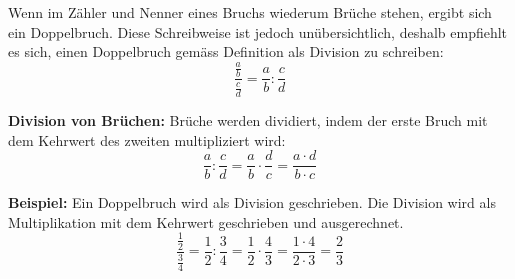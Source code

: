 Wenn im Zähler und Nenner eines Bruchs wiederum Brüche stehen, ergibt sich ein Doppelbruch. Diese Schreibweise ist jedoch unübersichtlich, deshalb empfiehlt es sich, einen Doppelbruch gemäss Definition als Division zu schreiben:
\[
  \frac{\frac{a}{b}}{\frac{c}{d}} = \frac{a}{b}:\frac{c}{d}
\]
\begin{theorem}
  \textbf{Division von Brüchen:} Brüche werden dividiert, indem der erste Bruch mit dem Kehrwert des zweiten multipliziert wird:
  \[
    \frac{a}{b}:\frac{c}{d} = \frac{a}{b}\cdot\frac{d}{c} = \frac{a\cdot d}{b\cdot c}
  \]
\end{theorem}
\begin{example}
  \textbf{Beispiel:} Ein Doppelbruch wird als Division geschrieben. Die Division wird als Multiplikation mit dem Kehrwert geschrieben und ausgerechnet.
  \[
    \frac{\frac{1}{2}}{\frac{3}{4}} = \frac{1}{2}:\frac{3}{4} = \frac{1}{2}\cdot\frac{4}{3} = \frac{1\cdot 4}{2\cdot 3} = \frac{2}{3}
  \]
\end{example}
